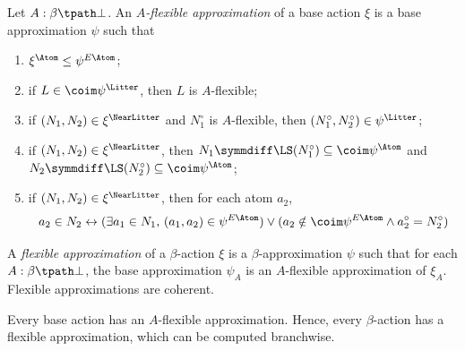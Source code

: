 \begin{definition}
  \label{def:FlexApprox}
  \leanok
  Let \( A : \beta \tpath \bot \).
  An \emph{\( A \)-flexible approximation} of a base action \( \xi \) is a base approximation \( \psi \) such that
  \begin{enumerate}
    \item \( \xi^\Atom \leq \psi^{E\Atom} \);
    \item if \( L \in \coim \psi^\Litter \), then \( L \) is \( A \)-flexible;
    \item if \( (N_1, N_2) \in \xi^\NearLitter \) and \( N_1^\circ \) is \( A \)-flexible, then \( (N_1^\circ, N_2^\circ) \in \psi^\Litter \);
    \item if \( (N_1, N_2) \in \xi^\NearLitter \), then \( N_1 \symmdiff \LS(N_1^\circ) \subseteq \coim \psi^\Atom \) and \( N_2 \symmdiff \LS(N_2^\circ) \subseteq \coim \psi^\Atom \);
    \item if \( (N_1, N_2) \in \xi^\NearLitter \), then for each atom \( a_2 \),
    \[ a_2 \in N_2 \leftrightarrow (\exists a_1 \in N_1,\, (a_1, a_2) \in \psi^{E\Atom}) \vee (a_2 \notin \coim \psi^{E\Atom} \wedge a_2^\circ = N_2^\circ) \]
  \end{enumerate}
  A \emph{flexible approximation} of a \( \beta \)-action \( \xi \) is a \( \beta \)-approximation \( \psi \) such that for each \( A : \beta \tpath \bot \), the base approximation \( \psi_A \) is an \( A \)-flexible approximation of \( \xi_A \).
  Flexible approximations are coherent.
\end{definition}
\begin{proposition}
  \label{prop:exists_flexApprox}
  \leanok
  Every base action has an \( A \)-flexible approximation.
  Hence, every \( \beta \)-action has a flexible approximation, which can be computed branchwise.
\end{proposition}
